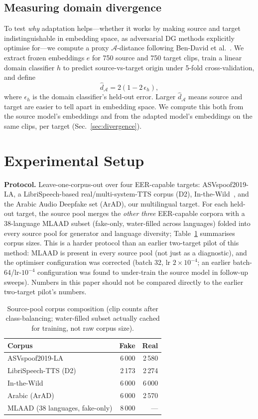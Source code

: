 \documentclass[conference]{IEEEtran}
\begin{document}
\subsection{Measuring domain divergence}
\label{sec:method-divergence}
To test \emph{why} adaptation helps---whether it works by making source and
target indistinguishable in embedding space, as adversarial DG methods
explicitly optimise for---we compute a proxy $\mathcal{A}$-distance following
Ben-David et al.~\cite{bendavid}. We extract frozen embeddings $e$ for 750
source and 750 target clips, train a linear domain classifier $h$ to predict
source-vs-target origin under 5-fold cross-validation, and define
\begin{equation}
\hat d_{\mathcal{A}} = 2\left(1-2\,\epsilon_h\right),
\end{equation}
where $\epsilon_h$ is the domain classifier's held-out error. Larger
$\hat d_{\mathcal{A}}$ means source and target are easier to tell apart in
embedding space. We compute this both from the source model's embeddings and
from the adapted model's embeddings on the same clips, per target
(Sec.~\ref{sec:divergence}).

\section{Experimental Setup}
\textbf{Protocol.} Leave-one-corpus-out over four EER-capable targets:
ASVspoof2019-LA, a LibriSpeech-based real/multi-system-TTS corpus (D2),
In-the-Wild~\cite{itw}, and the Arabic Audio Deepfake set (ArAD), our
multilingual target. For each held-out target, the source pool merges the
\emph{other three} EER-capable corpora with a 38-language MLAAD subset
(fake-only, water-filled across languages) folded into every source pool for
generator and language diversity; Table~\ref{tab:datastats} summarises corpus
sizes. This is a harder protocol than an earlier two-target pilot of this
method: MLAAD is present in every source pool (not just as a diagnostic), and
the optimiser configuration was corrected (batch 32, lr $2\times10^{-4}$; an
earlier batch-64/lr-$10^{-4}$ configuration was found to under-train the
source model in follow-up sweeps). Numbers in this paper should not be compared
directly to the earlier two-target pilot's numbers.

\begin{table}[t]
\centering
\caption{Source-pool corpus composition (clip counts after class-balancing;
water-filled subset actually cached for training, not raw corpus size).}
\label{tab:datastats}
\begin{tabular}{@{}lrr@{}}
\toprule
Corpus & Fake & Real \\
\midrule
ASVspoof2019-LA & 6\,000 & 2\,580 \\
LibriSpeech-TTS (D2) & 2\,173 & 2\,274 \\
In-the-Wild & 6\,000 & 6\,000 \\
Arabic (ArAD) & 6\,000 & 2\,570 \\
MLAAD (38 languages, fake-only) & 8\,000 & --- \\
\bottomrule
\end{tabular}
\end{table}
\end{document}
